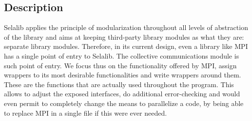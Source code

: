 \documentclass[]{report}   %
\begin{document}
\subsection{Description}
Selalib applies the principle of modularization throughout all levels of abstraction of the library and aims at keeping third-party library modules as what they are: separate library modules. Therefore, in its current design, even a library like MPI has a single point of entry to Selalib. The collective communications module is such point of entry. We focus thus on the functionality offered by MPI, assign wrappers to its most desirable functionalities and write wrappers around them. These are the functions that are actually used throughout the program.  This allows to adjust the exposed interfaces, do additional error-checking and would even permit to completely change the means to parallelize a code, by being able to replace MPI in a single file if this were ever needed.
\end{document}
